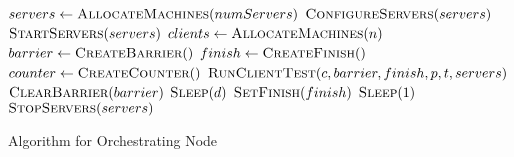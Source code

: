 \begin{algorithm}[ht!]
	\begin{algorithmic}
		\State $servers\gets \Call{AllocateMachines}{numServers}$
		\State $\Call {ConfigureServers}{servers}$
		\State $\Call {StartServers}{servers}$
		\State $clients\gets \Call{AllocateMachines}{n}$
		\State $barrier\gets \Call{CreateBarrier}{\null}$
		\State $finish\gets \Call{CreateFinish}{\null}$
		\State $counter\gets \Call{CreateCounter}{\null}$
		\State $\Call{RunClientTest}{c,barrier,finish,p,t,servers}$
		\EndFor
		\State {}
		\EndWhile
		\State $\Call{ClearBarrier}{barrier}$
		\State $\Call{Sleep}{d}$
		\State $\Call{SetFinish}{finish}$
		\State $\Call{Sleep}{1}$
		\EndWhile
		\State $\Call{StopServers}{servers}$
		\EndProcedure
		
	\end{algorithmic}
	\caption{Algorithm for Orchestrating Node}
	\label{algo:testOrchestration}
\end{algorithm}
